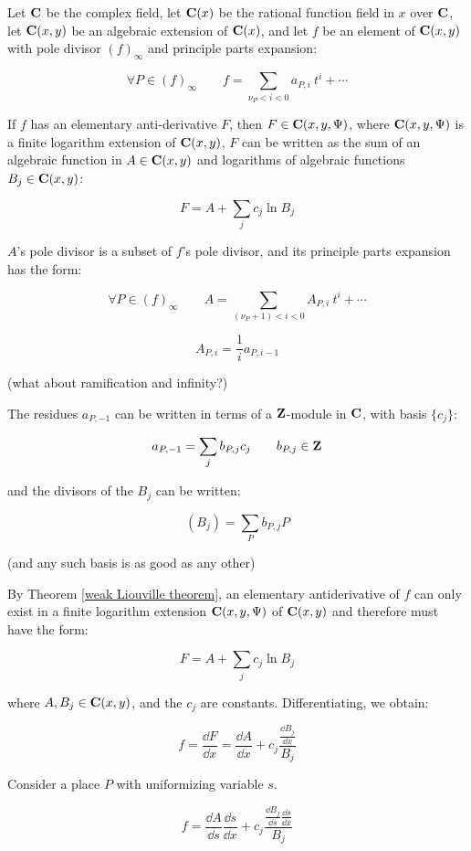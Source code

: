 \vfill\eject
{}

\theorem\label{abelian integration theorem}
Let $\mathbf{C}$ be the complex field, let
$\mathbf{C}(x)$ be the rational function field in $x$ over $\mathbf{C}$,
let $\mathbf{C}(x,y)$ be an algebraic extension of $\mathbf{C}(x)$,
and let $f$ be an element of $\mathbf{C}(x,y)$
with pole divisor $(f)_\infty$ and principle parts expansion:

$$\forall P \in (f)_\infty\qquad f = \sum_{\nu_P<i<0} a_{P,i}\ t^i + \cdots$$

If $f$ has
an elementary anti-derivative $F$, then $F \in \mathbf{C}(x, y, \Psi)$,
where $\mathbf{C}(x, y, \Psi)$ is a finite logarithm extension
of $\mathbf{C}(x,y)$, $F$ can be written as the sum of an algebraic
function in $A \in \mathbf{C}(x,y)$ and logarithms of algebraic functions $B_j \in \mathbf{C}(x,y)$:

$$F = A + \sum_j c_j \ln B_j$$

$A$'s pole divisor is a subset of $f$'s pole divisor, and its principle parts expansion has the form:

$$\forall P \in (f)_\infty\qquad A = \sum_{(\nu_P+1)<i<0} A_{P,i}\ t^i + \cdots$$

$$A_{P,i} = \frac{1}{i} a_{P,i-1}$$

(what about ramification and infinity?)

The residues $a_{P,-1}$ can be written in terms of a $\mathbf{Z}$-module in $\mathbf{C}$, with basis $\{c_j\}$:

$$a_{P,-1} = \sum_j b_{P,j} c_j \qquad b_{P,j} \in \mathbf{Z}$$

and the divisors of the $B_j$ can be written:

$$(B_j) = \sum_P b_{P,j} P$$

(and any such basis is as good as any other)

\vfill\eject
\proof

By Theorem \ref{weak Liouville theorem}, an elementary antiderivative
of $f$ can only exist in a finite logarithm extension $\mathbf{C}(x, y, \Psi)$
of $\mathbf{C}(x,y)$ and therefore must have the form:

$$F = A + \sum_j c_j \ln B_j$$

where $A,B_j \in \mathbf{C}(x,y)$, and the $c_j$ are constants.  Differentiating, we obtain:

$$f = \frac{\dd{F}}{\dd{x}} = \frac{\dd{A}}{\dd{x}} + c_j \frac{\frac{\dd{B_j}}{\dd{x}}}{B_j}$$

Consider a place $P$ with uniformizing variable $s$.

$$f = \frac{\dd{A}}{\dd{s}}\frac{\dd{s}}{\dd{x}} + c_j \frac{\frac{\dd{B_j}}{\dd{s}} \frac{\dd{s}}{\dd{x}}}{B_j}$$

